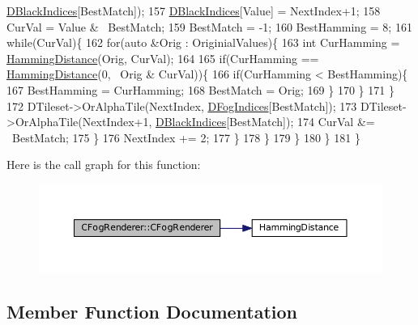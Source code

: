 \begin{DoxyCode}
      \hyperlink{classCFogRenderer_a09e3b546abbe52cc9addd1edfcc5ea9c}{DBlackIndices}[BestMatch]);
157                     \hyperlink{classCFogRenderer_a09e3b546abbe52cc9addd1edfcc5ea9c}{DBlackIndices}[Value] = NextIndex+1;
158                     CurVal = Value & ~BestMatch;
159                     BestMatch = -1;
160                     BestHamming = 8;    
161                     \textcolor{keywordflow}{while}(CurVal)\{
162                         \textcolor{keywordflow}{for}(\textcolor{keyword}{auto} &Orig : OriginialValues)\{
163                             \textcolor{keywordtype}{int} CurHamming = \hyperlink{FogRenderer_8cpp_a0cf7f6be616e12a84cc37fd98785fd52}{HammingDistance}(Orig, CurVal);
164                             
165                             \textcolor{keywordflow}{if}(CurHamming == \hyperlink{FogRenderer_8cpp_a0cf7f6be616e12a84cc37fd98785fd52}{HammingDistance}(0, ~Orig & CurVal))\{
166                                 \textcolor{keywordflow}{if}(CurHamming < BestHamming)\{
167                                     BestHamming = CurHamming;
168                                     BestMatch = Orig;
169                                 \}
170                             \}
171                         \}
172                         DTileset->OrAlphaTile(NextIndex, \hyperlink{classCFogRenderer_a2028e4642e756016819aab6567800af5}{DFogIndices}[BestMatch]);
173                         DTileset->OrAlphaTile(NextIndex+1, \hyperlink{classCFogRenderer_a09e3b546abbe52cc9addd1edfcc5ea9c}{DBlackIndices}[BestMatch]);
174                         CurVal &= ~BestMatch;
175                     \}
176                     NextIndex += 2;
177                 \}
178             \}
179         \}
180     \}
181 \}
\end{DoxyCode}
Here is the call graph for this function\+:\nopagebreak
\begin{figure}[H]
\begin{center}
\leavevmode
\includegraphics[width=350pt]{classCFogRenderer_aa802bea4a0983b7cbcacf4ebfc1cf6a3_cgraph}
\end{center}
\end{figure}


\subsection{Member Function Documentation}
\hypertarget{classCFogRenderer_aa7e0638c279ac426b9b643d26a38777e}{}\label{classCFogRenderer_aa7e0638c279ac426b9b643d26a38777e} 
